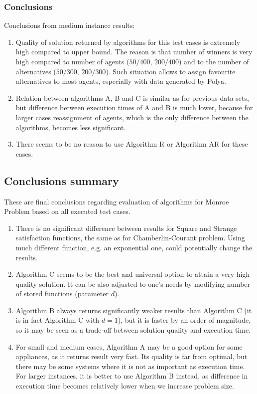 \subsubsection{Conclusions}

Conclusions from medium instance results:
\begin{enumerate}
	\item Quality of solution returned by algorithms for this test cases is extremely high compared to upper bound. The reason is that number of winners is very high compared to number of agents ($50/400$, $200/400$) and to the number of alternatives ($50/300$, $200/300$). Such situation allows to assign favourite alternatives to most agents, especially with data generated by Polya.
	\item Relation between algorithms A, B and C is similar as for previous data sets, but difference between execution times of A and B is much lower, because for larger cases reassignment of agents, which is the only difference between the algorithms, becomes less significant.
	\item There seems to be no reason to use Algorithm R or Algorithm AR for these cases.
\end{enumerate}

\subsection{Conclusions summary}

These are final conclusions regarding evaluation of algorithms for Monroe Problem based on all executed test cases.

\begin{enumerate}
	\item There is no significant difference between results for Square and Strange satisfaction functions, the same as for Chamberlin-Courant problem. Using much different function, e.g. an exponential one, could potentially change the results.
	\item Algorithm C seems to be the best and universal option to attain a very high quality solution. It can be also adjusted to one's needs by modifying number of stored functions (parameter $d$).
	\item Algorithm B always returns significantly weaker results than Algorithm C (it is in fact Algorithm C with $d = 1$), but it is faster by an order of magnitude, so it may be seen as a trade-off between solution quality and execution time.
	\item For small and medium cases, Algorithm A may be a good option for some appliances, as it returns result very fast. Its quality is far from optimal, but there may be some systems where it is not as important as execution time. For larger instances, it is better to use Algorithm B instead, as difference in execution time becomes relatively lower when we increase problem size.
\end{enumerate}